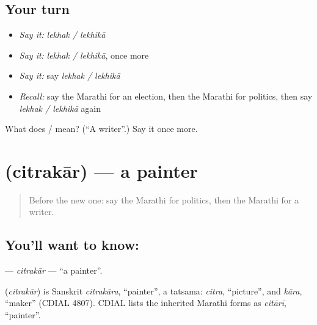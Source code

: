 \subsection*{Your turn}
\begin{itemize}
\raggedright
  \item \emph{Say it:} \emph{lekhak / lekhikā}
  \item \emph{Say it:} \emph{lekhak / lekhikā}, once more
  \item \emph{Say it:} say \emph{lekhak / lekhikā}
  \item \emph{Recall:} say the Marathi for an election, then the Marathi for politics, then say \emph{lekhak / lekhikā} again
\end{itemize}

\begin{tcolorbox}[breakable,colback=teal!4,colframe=teal!35!black,title={Before you move on}]
What does  /  mean? (\textquotedblleft{}A writer\textquotedblright{}.) Say it once more.
\end{tcolorbox}
\section[\texorpdfstring{\mr{चित्रकार} (citrakār)}{चित्रकार (citrakār)}]{ (citrakār) — a painter}

\label{lesson:MR-C180-citrakar}



\begin{quote}
Before the new one: say the Marathi for politics, then the Marathi for a writer.
\end{quote}

\subsection*{You'll want to know: }
\textbf{} — \emph{citrakār} — \textquotedblleft{}a painter\textquotedblright{}.

\begin{cousinweb}
\textbf{} (\emph{citrakār}) is Sanskrit \emph{citrakāra}, \textquotedblleft{}painter\textquotedblright{}, a tatsama: \emph{citra}, \textquotedblleft{}picture\textquotedblright{}, and \emph{kāra}, \textquotedblleft{}maker\textquotedblright{} (CDIAL 4807). CDIAL lists the inherited Marathi forms as \emph{citārī}, \textquotedblleft{}painter\textquotedblright{}.
\end{cousinweb}


